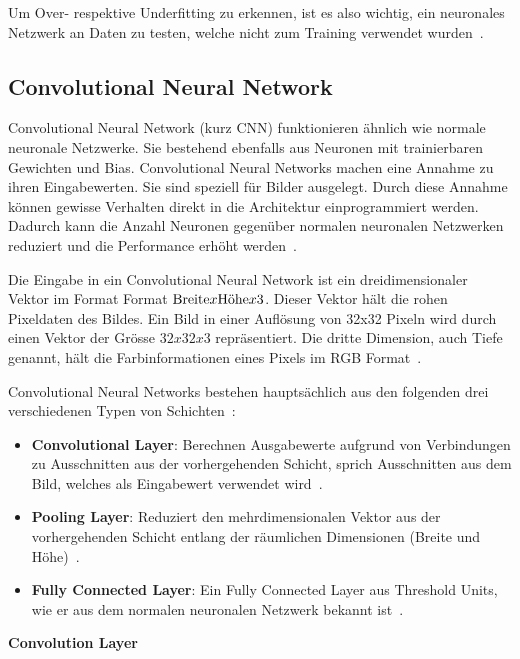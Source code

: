 Um Over- respektive Underfitting zu erkennen, ist es also wichtig, ein neuronales Netzwerk an Daten zu testen, welche nicht zum Training verwendet wurden~\autocite{Krogh2008}.

\subsection{Convolutional Neural Network}
\label{chap:cnn}

Convolutional Neural Network (kurz CNN) funktionieren ähnlich wie normale neuronale Netzwerke. Sie bestehend ebenfalls aus Neuronen mit trainierbaren Gewichten und Bias. Convolutional Neural Networks machen eine Annahme zu ihren Eingabewerten. Sie sind speziell für Bilder ausgelegt. Durch diese Annahme können gewisse Verhalten direkt in die Architektur einprogrammiert werden. Dadurch kann die Anzahl Neuronen gegenüber normalen neuronalen Netzwerken reduziert und die Performance erhöht werden~\autocite{CNN}.

Die Eingabe in ein Convolutional Neural Network ist ein dreidimensionaler Vektor im Format Format $\textnormal{Breite} x \textnormal{Höhe} x 3$. Dieser Vektor hält die rohen Pixeldaten des Bildes. Ein Bild in einer Auflösung von 32x32 Pixeln wird durch einen Vektor der Grösse $32x32x3$ repräsentiert. Die dritte Dimension, auch Tiefe genannt, hält die Farbinformationen eines Pixels im RGB Format~\autocite{CNN}.

Convolutional Neural Networks bestehen hauptsächlich aus den folgenden drei verschiedenen Typen von Schichten~\autocite{CNN}:

\begin{itemize}
    \item \textbf{Convolutional Layer}: Berechnen Ausgabewerte aufgrund von Verbindungen zu Ausschnitten aus der vorhergehenden Schicht, sprich Ausschnitten aus dem Bild, welches als Eingabewert verwendet wird~\autocite{CNN}.
    \item \textbf{Pooling Layer}: Reduziert den mehrdimensionalen Vektor aus der vorhergehenden Schicht entlang der räumlichen Dimensionen (Breite und Höhe)~\autocite{CNN}.
    \item \textbf{Fully Connected Layer}: Ein Fully Connected Layer aus Threshold Units, wie er aus dem normalen neuronalen Netzwerk bekannt ist~\autocite{CNN}.
\end{itemize}

\textbf{Convolution Layer}

\nopagebreak

